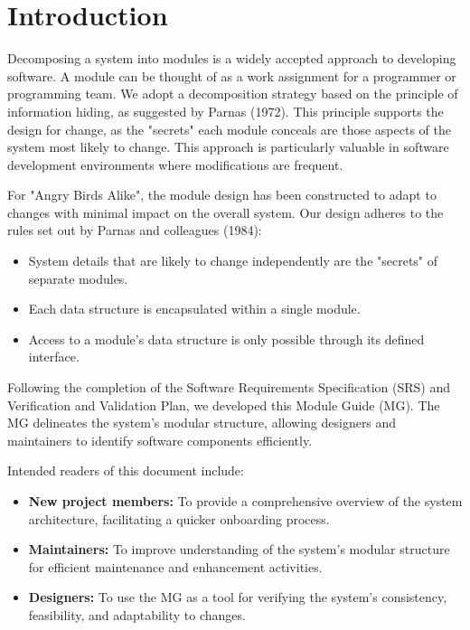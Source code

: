 \documentclass[12pt]{article}
\begin{document}
\section{Introduction}

Decomposing a system into modules is a widely accepted approach to developing software. A module can be thought of as a work assignment for a programmer or programming team. We adopt a decomposition strategy based on the principle of information hiding, as suggested by Parnas (1972). This principle supports the design for change, as the "secrets" each module conceals are those aspects of the system most likely to change. This approach is particularly valuable in software development environments where modifications are frequent.

For "Angry Birds Alike", the module design has been constructed to adapt to changes with minimal impact on the overall system. Our design adheres to the rules set out by Parnas and colleagues (1984):

\begin{itemize}
    \item System details that are likely to change independently are the "secrets" of separate modules.
    \item Each data structure is encapsulated within a single module.
    \item Access to a module's data structure is only possible through its defined interface.
\end{itemize}

Following the completion of the Software Requirements Specification (SRS) and Verification and Validation Plan, we developed this Module Guide (MG). The MG delineates the system's modular structure, allowing designers and maintainers to identify software components efficiently.

Intended readers of this document include:

\begin{itemize}
    \item \textbf{New project members:} To provide a comprehensive overview of the system architecture, facilitating a quicker onboarding process.
    \item \textbf{Maintainers:} To improve understanding of the system's modular structure for efficient maintenance and enhancement activities.
    \item \textbf{Designers:} To use the MG as a tool for verifying the system's consistency, feasibility, and adaptability to changes.
\end{itemize}
\end{document}
